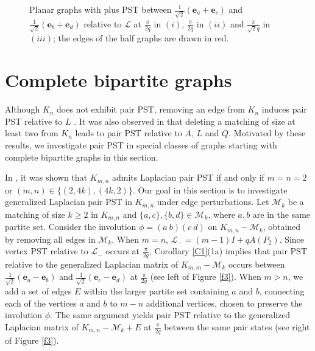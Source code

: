 \documentclass[12pt,a4paper]{article}
\def \e {{\mathbf e}}
\begin{document}
\begin{figure}
\begin{minipage}[t]{0.32\textwidth}
\end{minipage}
\vspace{-0.15in}
\caption{Planar graphs with plus PST between $\frac{1}{\sqrt{2}}(\e_a+\e_c)$ and $\frac{1}{\sqrt{2}}(\e_b+\e_d)$ relative to $\mathscr{L}$ at $\frac{\pi}{2q}$ in $(i)$, $\frac{\pi}{2q}$ in $(ii)$ and $\frac{\pi}{\sqrt{2}q}$ in $(iii)$; the edges of the half graphs are drawn in red.} 
\label{fig4}
\end{figure}


\section{Complete bipartite graphs}\label{sec3}

Although $K_n$ does not exhibit pair PST, removing an edge from $K_n$ induces pair PST relative to $L$ \cite[Corollary 5.4]{chen}. It was also observed in \cite[Theorem 4]{pal9} that deleting a matching of size at least two from $K_n$ leads to pair PST relative to $A$, $L$ and $Q$. Motivated by these results, we investigate pair PST in special classes of graphs starting with complete bipartite graphs in this section.

In \cite[Corollary 10.5]{god25}, it was shown that $K_{m,n}$ admits Laplacian pair PST if and only if  $m=n=2$ or $(m,n) \in \{(2,4k), (4k,2)\}$. Our goal in this section is to investigate generalized Laplacian pair PST in $K_{m,n}$ under edge perturbations. Let $\mathcal{M}_k$ be a matching of size $k \geq 2$ in $K_{m,n}$ and $\{a,c\},\{b,d\}\in \mathcal{M}_k$, where $a,b$ are in the same partite set. Consider the involution $\phi = (a~b)(c~d)$ on $K_{m,n} - \mathcal{M}_k$, obtained by removing all edges in $\mathcal{M}_k$. When $m = n$, $\mathscr{L}_{-} = (m-1) I + q A(P_2).$ Since vertex PST relative to $\mathscr{L}_{-}$ occurs at $\frac{\pi}{2q}$, Corollary \ref{C1}(1a) implies that pair PST relative to the generalized Laplacian matrix of $K_{m,m} - \mathcal{M}_k$ occurs between $\frac{1}{\sqrt{2}} \left( \mathbf{e}_a - \mathbf{e}_b \right)$ and $\frac{1}{\sqrt{2}} \left( \mathbf{e}_c - \mathbf{e}_d \right)$ at $\frac{\pi}{2q}$ (see left of Figure \ref{f3}). When $m > n$, we add a set of edges $E$ within the larger partite set containing $a$ and $b$, connecting each of the vertices $a$ and $b$ to $ m-n$ additional vertices, chosen to preserve the involution $\phi$. The same argument yields pair PST relative to the generalized Laplacian matrix of $K_{m,n} - \mathcal{M}_k + E$ at $\frac{\pi}{2q}$ between the same pair states (see right of Figure \ref{f3}).
\end{document}
